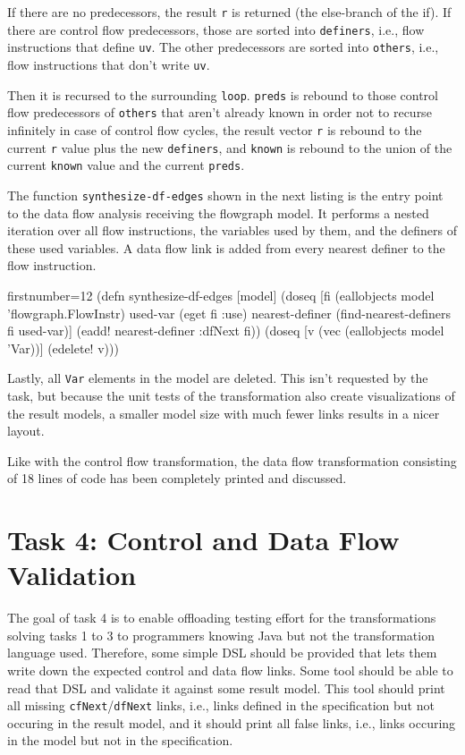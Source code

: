 \documentclass[11pt]{article}
\begin{document}
If there are no predecessors, the result \verb|r| is returned (the else-branch
of the if).  If there are control flow predecessors, those are sorted into
\verb|definers|, i.e., flow instructions that define \verb|uv|.  The other
predecessors are sorted into \verb|others|, i.e., flow instructions that don't
write \verb|uv|.

Then it is recursed to the surrounding \verb|loop|.  \verb|preds| is rebound to
those control flow predecessors of \verb|others| that aren't already known in
order not to recurse infinitely in case of control flow cycles, the result
vector \verb|r| is rebound to the current \verb|r| value plus the new
\verb|definers|, and \verb|known| is rebound to the union of the current
\verb|known| value and the current \verb|preds|.

The function \verb|synthesize-df-edges| shown in the next listing is the entry
point to the data flow analysis receiving the flowgraph model.  It performs a
nested iteration over all flow instructions, the variables used by them, and
the definers of these used variables.  A data flow link is added from every
nearest definer to the flow instruction.

\begin{clojurecode*}{firstnumber=12}
(defn synthesize-df-edges [model]
  (doseq [fi (eallobjects model 'flowgraph.FlowInstr)
          used-var (eget fi :use)
          nearest-definer (find-nearest-definers fi used-var)]
    (eadd! nearest-definer :dfNext fi))
  (doseq [v (vec (eallobjects model 'Var))]
    (edelete! v)))
\end{clojurecode*}

Lastly, all \verb|Var| elements in the model are deleted.  This isn't requested
by the task, but because the unit tests of the transformation also create
visualizations of the result models, a smaller model size with much fewer links
results in a nicer layout.

Like with the control flow transformation, the data flow transformation
consisting of 18 lines of code has been completely printed and discussed.


\section{Task 4: Control and Data Flow Validation}
\label{sec:task-4}

The goal of task 4 is to enable offloading testing effort for the
transformations solving tasks 1 to 3 to programmers knowing Java but not the
transformation language used.  Therefore, some simple DSL should be provided
that lets them write down the expected control and data flow links.  Some tool
should be able to read that DSL and validate it against some result model.
This tool should print all missing \verb|cfNext|/\verb|dfNext| links, i.e.,
links defined in the specification but not occuring in the result model, and it
should print all false links, i.e., links occuring in the model but not in the
specification.
\end{document}
